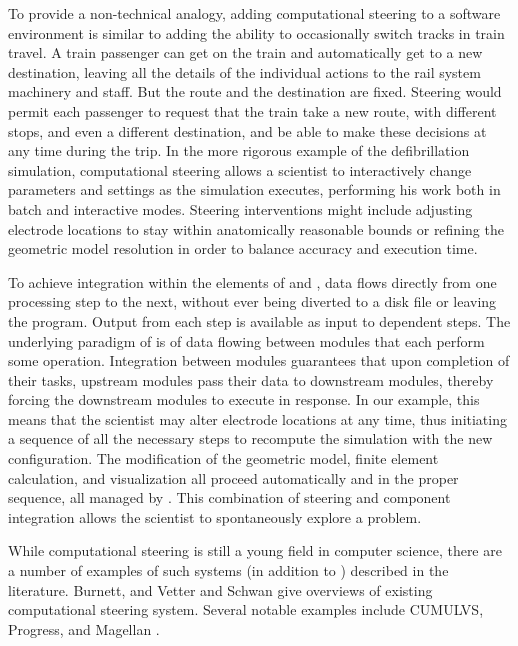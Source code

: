 To provide a non-technical analogy, adding computational steering to a
software environment is similar to adding the ability to occasionally
switch tracks in train travel.  A train passenger can get on the train
and automatically get to a new destination, leaving all the details of
the individual actions to the rail system machinery and staff.  But
the route and the destination are fixed.  Steering would permit each
passenger to request that the train take a new route, with different
stops, and even a different destination, and be able to make these
decisions at any time during the trip.  In the more rigorous example
of the defibrillation simulation, computational steering allows a
scientist to interactively change parameters and settings as the
simulation executes, performing his work both in batch and interactive
modes.  Steering interventions might include adjusting electrode
locations to stay within anatomically reasonable bounds or refining
the geometric model resolution in order to balance accuracy and
execution time.

To achieve integration within the elements of \SR{} and \BIOPSE{},
data flows directly from one processing step to the next, without ever
being diverted to a disk file or leaving the program.  Output from
each step is available as input to dependent steps.  The underlying
paradigm of \SR{} is of data flowing between modules that each perform
some operation.  Integration between modules guarantees that upon
completion of their tasks, upstream modules pass their data to
downstream modules, thereby forcing the downstream modules to execute
in response.  In our example, this means that the scientist may alter
electrode locations at any time, thus initiating a sequence of all the
necessary steps to recompute the simulation with the new
configuration.  The modification of the geometric model, finite
element calculation, and visualization all proceed automatically and
in the proper sequence, all managed by \SR{}.  This combination of
steering and component integration allows the scientist to
spontaneously explore a problem.

While computational steering is still a young field in computer
science, there are a number of examples of such systems (in addition
to \SR{}) described in the literature.  Burnett\cite{MM:Bur94}, and
Vetter and Schwan\cite{MM:Vet96} give overviews of existing
computational steering system.  Several notable examples include
CUMULVS\cite{MM:Gei96,MM:Koh97}, 
Progress\cite{MM:Vet95},  and Magellan\cite{MM:Vet97a}
.



